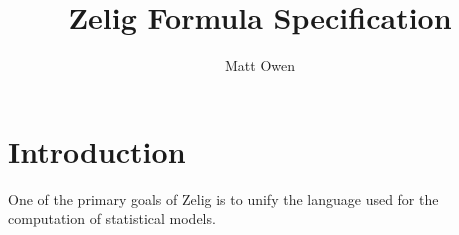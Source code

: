\documentclass{article}
\title{Zelig Formula Specification}
\author{Matt Owen}
\begin{document}
\maketitle

\section{Introduction}

One of the primary goals of Zelig is to unify the language used for the computation of statistical models.

\section{}
\end{document}

